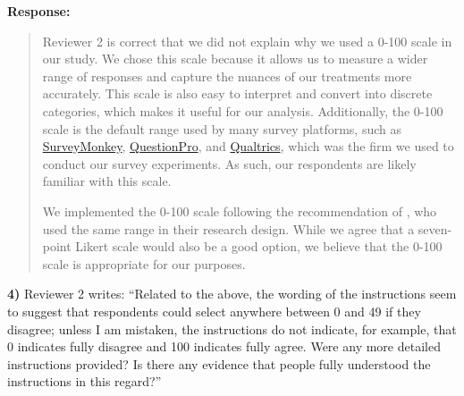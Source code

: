 \documentclass[a4paper,12pt]{article}
\begin{document}
\noindent \textbf{Response:} 
\begin{quote}

Reviewer 2 is correct that we did not explain why we used a 0-100 scale in our
study. We chose this scale because it allows us to measure a wider range of
responses and capture the nuances of our treatments more accurately. This scale
is also easy to interpret and convert into discrete categories, which makes it
useful for our analysis. Additionally, the 0-100 scale is the default range
used by many survey platforms, such as
\href{https://www.surveymonkey.co.uk/curiosity/new-introducing-slider-star-rating-question-types/}{SurveyMonkey},
\href{https://www.questionpro.com/blog/use-slider-scales-for-a-more-accurate-rating/}{QuestionPro},
and
\href{https://www.qualtrics.com/support/survey-platform/survey-module/editing-questions/question-types-guide/standard-content/slider/}{Qualtrics},
which was the firm we used to conduct our survey experiments. As such, our
respondents are likely familiar with this scale.

We implemented the 0-100 scale following the recommendation of
\citet{carter2020}, who used the same range in their research design. While we
agree that a seven-point Likert scale would also be a good option, we believe
that the 0-100 scale is appropriate for our purposes. 

\end{quote}

\vspace{.3cm}

\noindent \textbf{4)} Reviewer 2 writes: ``Related to the above, the wording of
the instructions seem to suggest that respondents could select anywhere between
0 and 49 if they disagree; unless I am mistaken, the instructions do not
indicate, for example, that 0 indicates fully disagree and 100 indicates fully
agree. Were any more detailed instructions provided? Is there any evidence that
people fully understood the instructions in this regard?''

\vspace{.3cm}
\end{document}
